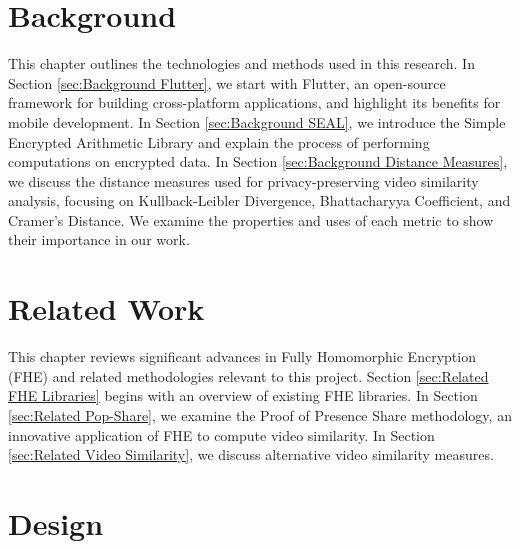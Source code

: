 \documentclass [11pt, proquest] {uwthesis}[2020/02/24]
\begin{document}




 
\chapter{Background}

This chapter outlines the technologies and methods used in this research. In Section \ref{sec:Background Flutter}, we start with Flutter, an open-source framework for building cross-platform applications, and highlight its benefits for mobile development. In Section \ref{sec:Background SEAL}, we introduce the Simple Encrypted Arithmetic Library and explain the process of performing computations on encrypted data. In Section \ref{sec:Background Distance Measures}, we discuss the distance measures used for privacy-preserving video similarity analysis, focusing on Kullback-Leibler Divergence, Bhattacharyya Coefficient, and Cramer’s Distance. We examine the properties and uses of each metric to show their importance in our work.





 
\chapter{Related Work}

This chapter reviews significant advances in Fully Homomorphic Encryption (FHE) and related methodologies relevant to this project. Section \ref{sec:Related FHE Libraries} begins with an overview of existing FHE libraries. In Section \ref{sec:Related Pop-Share}, we examine the Proof of Presence Share methodology, an innovative application of FHE to compute video similarity. In Section \ref{sec:Related Video Similarity}, we discuss alternative video similarity measures.





 
\chapter{Design}
\end{document}
